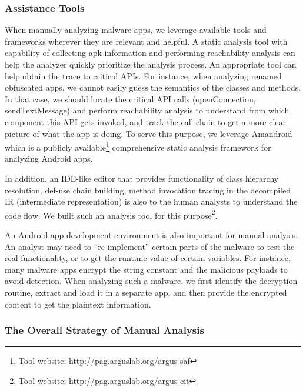 \subsubsection{Assistance Tools}

When manually analyzing malware apps, we leverage available tools and 
frameworks wherever they are relevant and helpful. 
A static analysis tool with capability of 
collecting apk information and performing
reachability analysis can help the analyzer quickly prioritize the analysis process.
An appropriate tool can help obtain the trace to critical APIs.
For instance, when analyzing renamed obfuscated apps, we cannot easily guess the semantics
of the classes and methods. In that case, we should locate the critical API calls (\eg openConnection,
sendTextMessage) and perform reachability analysis to understand from which component this API
gets invoked, and track the call chain to get a more clear picture of what
the app is doing.
To serve this purpose, we leverage Amandroid~\cite{wei2014amandroid} which is a publicly 
available\footnote{Tool website: \url{http://pag.arguslab.org/argus-saf}}
comprehensive static analysis framework for analyzing Android apps.

In addition, an IDE-like editor that provides functionality of 
class hierarchy resolution, def-use chain building, method invocation tracing in
the decompiled IR (intermediate representation) is also to the human analysts to
understand the code flow. We built such an analysis tool for this 
purpose\footnote{Tool website: \url{http://pag.arguslab.org/argus-cit}}.


An Android app development environment is also important for manual analysis. 
An analyst may need to ``re-implement'' certain parts of the malware to test 
the real functionality, or to get the runtime value of certain variables.
For instance, many malware apps encrypt the string constant and the malicious 
payloads to avoid detection. 
When analyzing such a malware, we first identify the decryption routine, extract 
and load it in a separate app, and then provide the 
encrypted content to get the plaintext information.

\subsubsection{The Overall Strategy of Manual Analysis}


